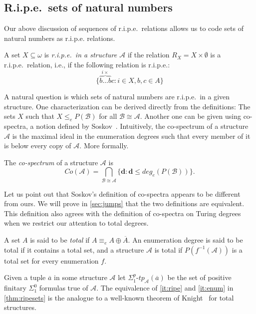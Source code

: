 \documentclass[11pt]{amsart}
\newcommand{\A}{{\mathcal{A}}}
\newcommand{\B}{{\mathcal{B}}}
\renewcommand{\bar}[1]{\overline{#1}}
\begin{document}
\subsection{R.i.p.e.\ sets of natural numbers}
Our above discussion of sequences of r.i.p.e.\ relations allows us to code sets of natural numbers as r.i.p.e. relations. 
\begin{defn}
    A set $X\subseteq\omega$ is \emph{r.i.p.e.\ in a structure $\A$} if the relation $R_X=X\times \emptyset$ is a r.i.p.e.\ relation, i.e., if the following relation is r.i.p.e.:
    \[ \{\overbrace{b\dots b}^{i\times}c: i\in X, b,c\in A\}\]
\end{defn}
A natural question is which sets of natural numbers are r.i.p.e.\ in a given structure. One characterization can be derived directly from the definitions: The sets $X$ such that $X\leq_e P(\B)$ for all $\B\cong \A$. Another one can be given using co-spectra, a notion defined by Soskov~\cite{soskov2004}. Intuitively, the co-spectrum of a structure $\A$ is the maximal ideal in the enumeration degrees such that every member of it is below every copy of $\A$. More formally.
\begin{defn}\label{def:cospectra}
    The \emph{co-spectrum} of a structure $\A$ is
        \[ Co(\A)=\bigcap_{\B\cong \A}\{ \mathbf d : \mathbf d\leq deg_e(P(\B))\}.\]
\end{defn}
Let us point out that Soskov's definition of co-spectra appears to be different from ours. We will prove in \cref{sec:jumps} that the two definitions are equivalent. This definition also agrees with the definition of co-spectra on Turing degrees when we restrict our attention to total degrees.

\begin{defn}
    A set $A$ is said to be \emph{total} if $A \equiv_e A \oplus \bar A$. An enumeration degree is said to be total if it contains a total set, and a structure $\A$ is total if $P(f^{-1}(\A))$ is a total set for every enumeration $f$.
\end{defn}

Given a tuple $\bar a$ in some structure $\A$ let $\Sigma_1^p\text{-}tp_\A(\bar a)$ be the set of positive finitary $\Sigma_1^0$ formulas true of $\A$. The equivalence of \cref{it:ripe} and \cref{it:enum} in \cref{thm:ripesets} is the analogue to a well-known theorem of Knight~\cite{knight1986} for total structures.
\end{document}

